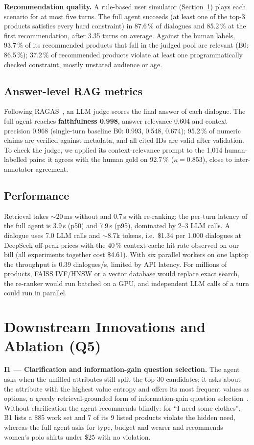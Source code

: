 \documentclass[10pt,a4paper,twocolumn]{article}
\begin{document}
\textbf{Recommendation quality.} A rule-based user simulator (Section~\ref{sec:q5}) plays each scenario for at most five turns. The full agent succeeds (at least one of the top-3 products satisfies every hard constraint) in 87.6\,\% of dialogues and 85.2\,\% at the first recommendation, after 3.35 turns on average. Against the human labels, 93.7\,\% of its recommended products that fall in the judged pool are relevant (B0: 86.5\,\%); 37.2\,\% of recommended products violate at least one programmatically checked constraint, mostly unstated audience or age.

\subsection{Answer-level RAG metrics}
Following RAGAS~\cite{es2024}, an LLM judge scores the final answer of each dialogue. The full agent reaches \textbf{faithfulness 0.998}, answer relevance 0.604 and context precision 0.968 (single-turn baseline B0: 0.993, 0.548, 0.674); 95.2\,\% of numeric claims are verified against metadata, and all cited IDs are valid after validation. To check the judge, we applied its context-relevance prompt to the 1,014 human-labelled pairs: it agrees with the human gold on 92.7\,\% ($\kappa{=}0.853$), close to inter-annotator agreement.

\subsection{Performance}
Retrieval takes $\sim$20\,ms without and 0.7\,s with re-ranking; the per-turn latency of the full agent is 3.9\,s (p50) and 7.9\,s (p95), dominated by 2–3 LLM calls. A dialogue uses 7.0 LLM calls and $\sim$8.7k tokens, i.e.\ \$1.34 per 1,000 dialogues at DeepSeek off-peak prices with the 40\,\% context-cache hit rate observed on our bill (all experiments together cost \$4.61). With six parallel workers on one laptop the throughput is 0.39 dialogues/s, limited by API latency. For millions of products, FAISS IVF/HNSW or a vector database would replace exact search, the re-ranker would run batched on a GPU, and independent LLM calls of a turn could run in parallel.

\section{Downstream Innovations and Ablation (Q5)}\label{sec:q5}
\textbf{I1 — Clarification and information-gain question selection.} The agent asks when the unfilled attributes still split the top-30 candidates; it asks about the attribute with the highest value entropy and offers its most frequent values as options, a greedy retrieval-grounded form of information-gain question selection~\cite{hu2024,zou2020}. Without clarification the agent recommends blindly: for ``I need some clothes'', B1 lists a \$85 work set and 7 of its 9 listed products violate the hidden need, whereas the full agent asks for type, budget and wearer and recommends women's polo shirts under \$25 with no violation.
\end{document}
